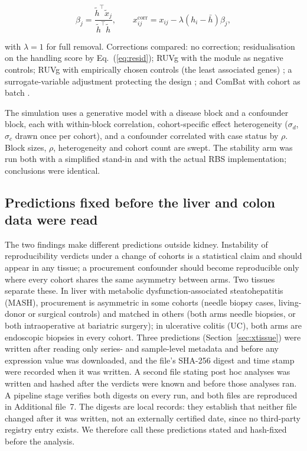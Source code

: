 \documentclass[pdflatex,sn-vancouver-num]{sn-jnl}
\theoremstyle{thmstyleone}
\theoremstyle{thmstyletwo}
\theoremstyle{thmstylethree}
\begin{document}
\begin{equation}
\beta_j = \frac{\tilde{h}^{\top} \tilde{x}_j}{\tilde{h}^{\top} \tilde{h}} , \qquad
x_{ij}^{\text{corr}} = x_{ij} - \lambda (h_i - \bar{h}) \beta_j ,
\label{eq:resid}
\end{equation}

with $\lambda = 1$ for full removal. Corrections compared: no correction; residualisation on
the handling score by Eq.~(\ref{eq:resid}); RUVg with the module as negative controls; RUVg with
empirically chosen controls (the least associated genes) \cite{risso2014}; a surrogate-variable
adjustment protecting the design \cite{leek2007}; and ComBat with cohort as batch
\cite{johnson2007}.

The simulation uses a generative model with a disease block and a confounder block, each
with within-block correlation, cohort-specific effect heterogeneity ($\sigma_d$, $\sigma_c$ drawn once per cohort),
and a confounder correlated with case status by $\rho$. Block sizes, $\rho$, heterogeneity and
cohort count are swept. The stability arm was run both with a simplified stand-in and with the
actual RBS implementation; conclusions were identical.

\subsection{Predictions fixed before the liver and colon data were read}\label{sec:xtmethods}

The two findings make different predictions outside kidney. Instability of reproducibility
verdicts under a change of cohorts is a statistical claim and should appear in any tissue; a
procurement confounder should become reproducible only where every cohort shares the same
asymmetry between arms. Two tissues separate these. In liver with metabolic
dysfunction-associated steatohepatitis (MASH), procurement is asymmetric in some cohorts (needle
biopsy cases, living-donor or surgical controls) and matched in others (both arms needle
biopsies, or both intraoperative at bariatric surgery); in ulcerative colitis (UC), both arms
are endoscopic biopsies in every cohort. Three predictions (Section~\ref{sec:xtissue}) were
written after reading only series- and sample-level metadata and before any expression value was
downloaded, and the file's SHA-256 digest and time stamp were recorded when it was written. A
second file stating post hoc analyses was written and hashed after the verdicts were known and
before those analyses ran. A pipeline stage verifies both digests on every run, and both files
are reproduced in Additional file~7. The digests are local records: they establish that neither
file changed after it was written, not an externally certified date, since no third-party registry
entry exists. We therefore call these predictions stated and hash-fixed before the analysis.
\end{document}
